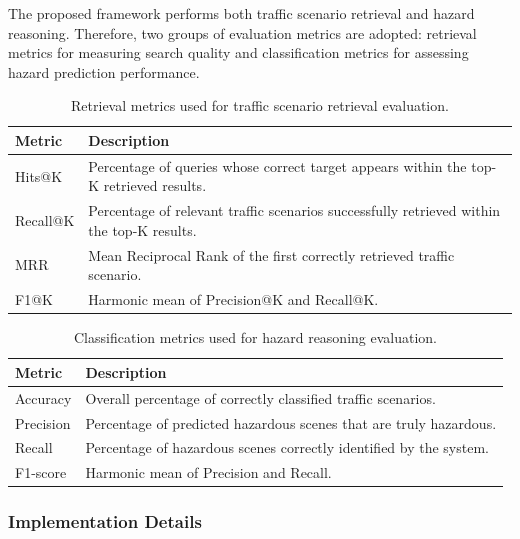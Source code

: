 \documentclass[a4paper, 11pt]{article} %
\begin{document}
The proposed framework performs both traffic scenario retrieval and hazard reasoning. Therefore, two groups of evaluation metrics are adopted: retrieval metrics for measuring search quality and classification metrics for assessing hazard prediction performance.
\begin{table}[H]
\centering
\begin{tabular}{|p{3.8cm}|p{10.2cm}|}
\hline
\textbf{Metric} & \textbf{Description} \\
\hline

Hits@K &
Percentage of queries whose correct target appears within the top-K retrieved results.
\\
\hline

Recall@K &
Percentage of relevant traffic scenarios successfully retrieved within the top-K results.
\\
\hline

MRR &
Mean Reciprocal Rank of the first correctly retrieved traffic scenario.
\\
\hline

F1@K &
Harmonic mean of Precision@K and Recall@K.
\\
\hline

\end{tabular}
\caption{Retrieval metrics used for traffic scenario retrieval evaluation.}
\label{tab:metrics_retrieval}
\end{table}
\begin{table}[H]
\centering
\begin{tabular}{|p{3.8cm}|p{10.2cm}|}
\hline
\textbf{Metric} & \textbf{Description} \\
\hline

Accuracy &
Overall percentage of correctly classified traffic scenarios.
\\
\hline

Precision &
Percentage of predicted hazardous scenes that are truly hazardous.
\\
\hline

Recall &
Percentage of hazardous scenes correctly identified by the system.
\\
\hline

F1-score &
Harmonic mean of Precision and Recall.
\\
\hline

\end{tabular}
\caption{Classification metrics used for hazard reasoning evaluation.}
\label{tab:metrics_classification}
\end{table}
\subsubsection{Implementation Details}
\end{document}
